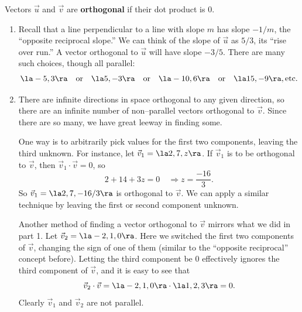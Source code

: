{Vectors $\vec u$ and $\vec v$ are \textbf{orthogonal} if their dot product is 0.
}


{\begin{enumerate}
	\item Recall that a line perpendicular to a line with slope $m$ has slope $-1/m$, the ``opposite reciprocal slope.'' We can think of the slope of $\vec u$ as $5/3$, its ``rise over run.'' A vector orthogonal to $\vec u$ will have slope $-3/5$. There are many such choices, though all parallel:
	$$\la -5,3\ra \quad \text{or} \quad\la 5,-3\ra \quad \text{or} \quad \la -10,6\ra\quad \text{or} \quad \la 15,-9\ra,\text{etc.}$$
	\item		There are infinite directions in space orthogonal to any given direction, so there are an infinite number of non--parallel vectors orthogonal to $\vec v$. Since there are so many, we have great leeway in finding some.
	
	One way is to arbitrarily pick values for the first two components, leaving the third unknown. For instance, let $\vec v_1 = \la 2,7,z\ra$. If $\vec v_1$ is to be orthogonal to $\vec v$, then $\vec v_1\cdot\vec v = 0$, so 
	$$2+14+3z=0 \quad \Rightarrow z = \frac{-16}{3}.$$
	So $\vec v_1 = \la 2, 7, -16/3\ra$ is orthogonal to $\vec v$. We can apply a similar technique by leaving the first or second component unknown.
	
	Another method of finding a vector orthogonal to $\vec v$ mirrors what we did in part 1. Let $\vec v_2 = \la-2,1,0\ra$. Here we switched the first two components of $\vec v$, changing the sign of one of them (similar to the ``opposite reciprocal'' concept before). Letting the third component be 0 effectively ignores the third component of $\vec v$, and it is easy to see that 
	$$\vec v_2\cdot\vec v = \la -2,1,0\ra\cdot\la 1,2,3\ra = 0.$$
	Clearly $\vec v_1$ and $\vec v_2$ are not parallel.
\end{enumerate}
\baselineskip
}\\

